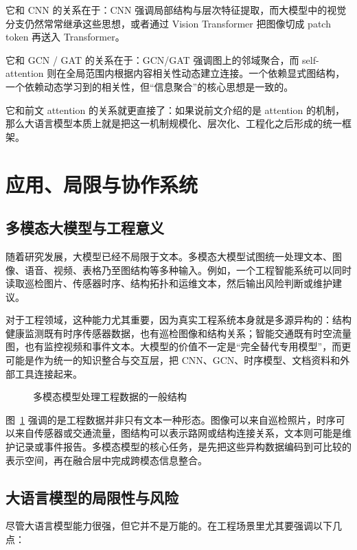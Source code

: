 它和 CNN 的关系在于：CNN 强调局部结构与层次特征提取，而大模型中的视觉分支仍然常常继承这些思想，或者通过 Vision Transformer 把图像切成 patch token 再送入 Transformer。

它和 GCN / GAT 的关系在于：GCN/GAT 强调图上的邻域聚合，而 self-attention 则在全局范围内根据内容相关性动态建立连接。一个依赖显式图结构，一个依赖动态学习到的相关性，但“信息聚合”的核心思想是一致的。

它和前文 attention 的关系就更直接了：如果说前文介绍的是 attention 的机制，那么大语言模型本质上就是把这一机制规模化、层次化、工程化之后形成的统一框架。

\section{应用、局限与协作系统}

\subsection{多模态大模型与工程意义}

随着研究发展，大模型已经不局限于文本。多模态大模型试图统一处理文本、图像、语音、视频、表格乃至图结构等多种输入。例如，一个工程智能系统可以同时读取巡检图片、传感器时序、结构拓扑和运维文本，然后输出风险判断或维护建议。

对于工程领域，这种能力尤其重要，因为真实工程系统本身就是多源异构的：结构健康监测既有时序传感器数据，也有巡检图像和结构关系；智能交通既有时空流量图，也有监控视频和事件文本。大模型的价值不一定是“完全替代专用模型”，而更可能是作为统一的知识整合与交互层，把 CNN、GCN、时序模型、文档资料和外部工具连接起来。

\begin{figure}[H]
  \centering
  \resizebox{\textwidth}{!}{}
  \caption{多模态模型处理工程数据的一般结构}
  \label{fig:ch11_orig2}
\end{figure}

图~\ref{fig:ch11_orig2} 强调的是工程数据并非只有文本一种形态。图像可以来自巡检照片，时序可以来自传感器或交通流量，图结构可以表示路网或结构连接关系，文本则可能是维护记录或事件报告。多模态模型的核心任务，是先把这些异构数据编码到可比较的表示空间，再在融合层中完成跨模态信息整合。

\subsection{大语言模型的局限性与风险}

尽管大语言模型能力很强，但它并不是万能的。在工程场景里尤其要强调以下几点：


